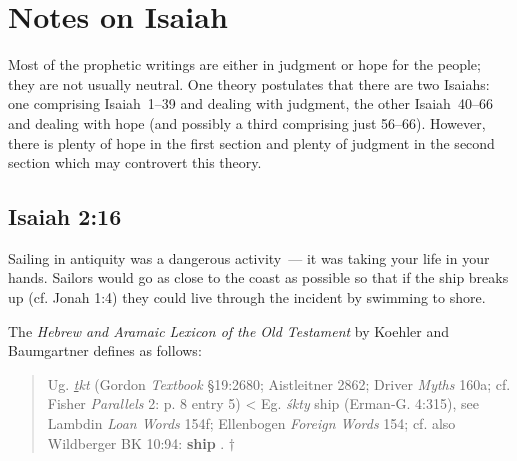 \section{Notes on Isaiah}\label{app:isaiah}
Most of the prophetic writings are either in judgment or hope for the people; they are not usually neutral. One theory postulates that there are two Isaiahs: one comprising Isaiah~1--39 and dealing with judgment, the other Isaiah~40--66 and dealing with hope (and possibly a third comprising just 56--66). However, there is plenty of hope in the first section and plenty of judgment in the second section which may controvert this theory.

\subsection{Isaiah 2:16}\label{app:isa-2-16}
Sailing in antiquity was a dangerous activity~--- it was taking your life in your hands. Sailors would go as close to the coast as possible so that if the ship breaks up (cf. Jonah 1:4) they could live through the incident by swimming to shore.

The \textit{Hebrew and Aramaic Lexicon of the Old Testament} by Koehler and Baumgartner defines  as follows:
\begin{quote}
    Ug. \textit{\underline{t}kt} (Gordon \textit{Textbook} \S19:2680; Aistleitner 2862; Driver \textit{Myths} 160a; cf. Fisher \textit{Parallels} 2: p. 8 entry 5) < Eg. \textit{\'skty} ship (Erman-G. 4:315), see Lambdin \textit{Loan Words} 154f; Ellenbogen \textit{Foreign Words} 154; cf. also Wildberger BK 10:94: \textbf{ship} . $\dagger$
\end{quote}

